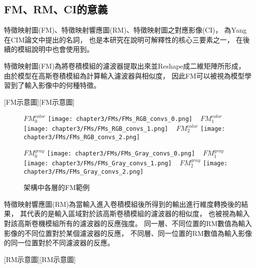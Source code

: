 \documentclass[class=NCU_thesis, crop=false]{standalone}
\begin{document}
	\subsection{FM、RM、CI的意義}
	\label{section:InterablePicture}
	特徵映射圖(FM)、特徵映射響應圖(RM)、特徵映射圖之對應影像(CI)，
	為Yang在CIM論文中提出的名詞，
	也是本研究在說明可解釋性的核心三要素之一，
	在後續的模組說明中也會使用到。

	特徵映射圖(FM)為將卷積模組的濾波器提取出來並Reshape成二維矩陣所形成，
	由於模型在高斯卷積模組為計算輸入濾波器與相似度，
	因此FM可以被視為模型學習到了輸入影像中的何種特徵。

	[FM示意圖][FM示意圖]

	\begin{figure}[H]
    \centering
    \subcaptionbox
        {$FM^{color}_0$
        \label{fig:FM_color_0}}
        {\texttt{[image: chapter3/FMs/FMs\_RGB\_convs\_0.png]}}
    ~
    \subcaptionbox
        {$FM^{color}_1$
        \label{fig:FM_color_1}}
        {\texttt{[image: chapter3/FMs/FMs\_RGB\_convs\_1.png]}}
    ~
    \subcaptionbox
        {$FM^{color}_2$
        \label{fig:FM_color_2}}
        {\texttt{[image: chapter3/FMs/FMs\_RGB\_convs\_2.png]}}

     \subcaptionbox
        {$FM^{gray}_0$
        \label{fig:FM_gray_0}}
        {\texttt{[image: chapter3/FMs/FMs\_Gray\_convs\_0.png]}}
    ~
    \subcaptionbox
        {$FM^{gray}_1$
        \label{fig:FM_gray_1}}
        {\texttt{[image: chapter3/FMs/FMs\_Gray\_convs\_1.png]}}
    ~
    \subcaptionbox
        {$FM^{gray}_2$
        \label{fig:FM_gray_2}}
        {\texttt{[image: chapter3/FMs/FMs\_Gray\_convs\_2.png]}}
    \caption{架構中各層的FM範例}
    \label{fig:FMs}
	\end{figure}

	特徵映射響應圖(RM)為當輸入進入卷積模組後所得到的輸出進行維度轉換後的結果，
	其代表的是輸入區域對於該高斯卷積模組的濾波器的相似度，
	也被視為輸入對該高斯卷機模組所有的濾波器的反應強度。
	同一層、不同位置的RM數值為輸入影像的不同位置對於某個濾波器的反應，
	不同層、同一位置的RM數值為輸入影像的同一位置對於不同濾波器的反應。

	[RM示意圖\cite{YangCNNInterpretable}][RM示意圖]
\end{document}
